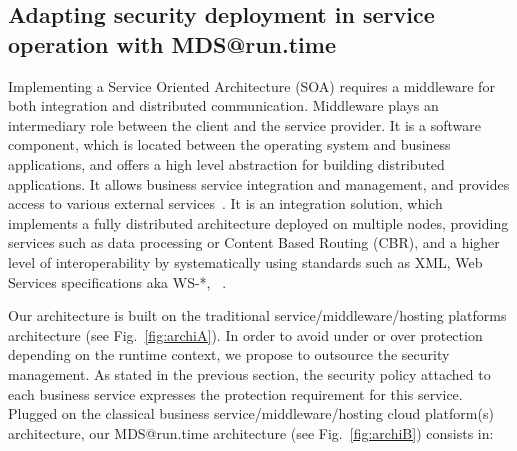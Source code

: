 \documentclass[runningheads,a4paper]{llncs}
\begin{document}
\subsection{Adapting security deployment in service operation with MDS@run.time}

Implementing a Service Oriented Architecture (SOA) requires a middleware for both integration and distributed communication. Middleware plays an intermediary role between the client and the service provider. It is a software component, which is located between the operating system and business applications, and offers a high level abstraction for building distributed applications. It allows business service integration and management, and provides access to various external services~\cite{SHLP05}. It is an integration solution, which implements a fully distributed architecture deployed on multiple nodes, providing services such as data processing or Content Based Routing (CBR), and a higher level of interoperability by systematically using standards such as XML, Web Services specifications aka WS-*, ~\cite{Lou08}.
 
Our architecture is built on the traditional service/middleware/hosting platforms architecture (see Fig.~\ref{fig:archiA}). In order to avoid under or over protection depending on the runtime context, we propose to outsource the security management. As stated in the previous section, the security policy attached to each business service expresses the protection requirement for this service. Plugged on the classical business service/middleware/hosting cloud platform(s) architecture, our MDS@run.time architecture (see Fig.~\ref{fig:archiB}) consists in:
\end{document}
